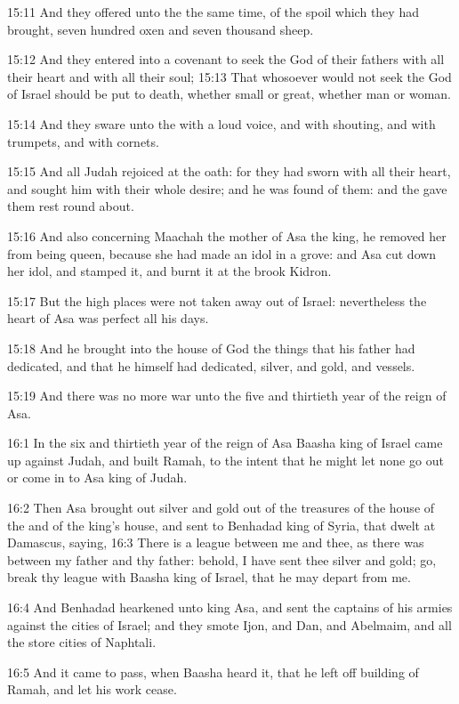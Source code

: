 15:11 And they offered unto the \LORD the same time, of the spoil which
they had brought, seven hundred oxen and seven thousand sheep.

15:12 And they entered into a covenant to seek the \LORD God of their
fathers with all their heart and with all their soul; 15:13 That
whosoever would not seek the \LORD God of Israel should be put to
death, whether small or great, whether man or woman.

15:14 And they sware unto the \LORD with a loud voice, and with
shouting, and with trumpets, and with cornets.

15:15 And all Judah rejoiced at the oath: for they had sworn with all
their heart, and sought him with their whole desire; and he was found
of them: and the \LORD gave them rest round about.

15:16 And also concerning Maachah the mother of Asa the king, he
removed her from being queen, because she had made an idol in a grove:
and Asa cut down her idol, and stamped it, and burnt it at the brook
Kidron.

15:17 But the high places were not taken away out of Israel:
nevertheless the heart of Asa was perfect all his days.

15:18 And he brought into the house of God the things that his father
had dedicated, and that he himself had dedicated, silver, and gold,
and vessels.

15:19 And there was no more war unto the five and thirtieth year of
the reign of Asa.

16:1 In the six and thirtieth year of the reign of Asa Baasha king of
Israel came up against Judah, and built Ramah, to the intent that he
might let none go out or come in to Asa king of Judah.

16:2 Then Asa brought out silver and gold out of the treasures of the
house of the \LORD and of the king's house, and sent to Benhadad king
of Syria, that dwelt at Damascus, saying, 16:3 There is a league
between me and thee, as there was between my father and thy father:
behold, I have sent thee silver and gold; go, break thy league with
Baasha king of Israel, that he may depart from me.

16:4 And Benhadad hearkened unto king Asa, and sent the captains of
his armies against the cities of Israel; and they smote Ijon, and Dan,
and Abelmaim, and all the store cities of Naphtali.

16:5 And it came to pass, when Baasha heard it, that he left off
building of Ramah, and let his work cease.

